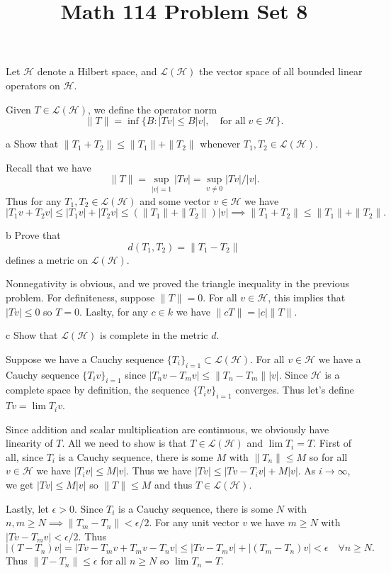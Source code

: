 \documentclass[11pt,letterpaper]{article}
\title{\textbf{Math 114 Problem Set 8}}
\def\H{\mathcal{H}}
\def\L{\mathcal{L}}
\begin{document}
\maketitle

\begin{problem}
    Let $\H$ denote a Hilbert space, and $\L(\H)$ the vector space of all bounded linear operators on $\H$.
\end{problem}

\begin{solution}
    Given $T \in \L(\H)$, we define the operator norm
    \[
        \|T\| = \inf\{B : |Tv| \leq B|v|,\quad\text{for all}\;v \in \H\}.
    \]
    \begin{partproblem}{a}
        Show that $\|T_1+T_2\| \leq \|T_1\|+\|T_2\|$ whenever $T_1,T_2 \in \L(\H)$.
    \end{partproblem}

    \quad Recall that we have
    \[
        \|T\| = \sup_{|v|=1} |Tv| = \sup_{v\neq 0} |Tv| / |v|
    .\] 
    Thus for any $T_1,T_2 \in \L(\H)$ and some vector $v\in \H$ we have
    \[
        |T_1v+T_2v| \leq |T_1v|+|T_2v| \leq (\|T_1\|+\|T_2\|)|v| \implies \|T_1+T_2\|\leq \|T_1\|+\|T_2\|
    .\] 

    \begin{partproblem}{b}
        Prove that
        \[
            d(T_1,T_2) = \|T_1-T_2\|
        \]
        defines a metric on $\L(\H)$.
    \end{partproblem}

    \quad Nonnegativity is obvious, and we proved the triangle inequality in the previous problem. For definiteness, suppose $\|T\|=0$. For all $v\in \H$, this implies that $|Tv|\leq 0$ so $T=0$. Laslty, for any $c\in k$ we have $\|cT\|=|c|\|T\|$.

    \begin{partproblem}{c}
        Show that $\L(\H)$ is complete in the metric $d$.
    \end{partproblem}

    \quad Suppose we have a Cauchy sequence $\{T_i\}_{i=1} \subset \L(\H)$. For all $v\in \H$ we have a Cauchy sequence $\{T_i v\}_{i=1}$ since $|T_n v - T_m v| \leq \|T_n - T_m\| |v|$. Since $\H$ is a complete space by definition, the sequence $\{T_i v\}_{i=1}$ converges. Thus let's define $Tv = \lim T_i v$. 
    
    \quad Since addition and scalar multiplication are continuous, we obviously have linearity of $T$. All we need to show is that $T\in \L(\H)$ and $\lim T_i = T$. First of all, since $T_i$ is a Cauchy sequence, there is some $M$ with $\|T_n\|\leq M$ so for all $v\in \H$ we have $|T_i v|\leq M|v|$. Thus we have $|Tv|\leq |Tv-T_iv|+M|v|$. As $i\to \infty$, we get $|Tv|\leq M|v|$ so $\|T\|\leq M$ and thus $T\in \L(\H)$.

    \quad Lastly, let $\epsilon>0$. Since $T_i$ is a Cauchy sequence, there is some $N$ with $n,m\geq N \implies \|T_m-T_n\|<\epsilon /2$. For any unit vector $v$ we have $m\geq N$ with $|Tv-T_mv|<\epsilon /2$. Thus
    \[
        |(T-T_n)v|=|Tv-T_mv+T_mv-T_nv|\leq |Tv -T_mv|+|(T_m-T_n)v|<\epsilon\quad \forall n\geq N
    .\] 
    Thus $\|T-T_n\|\leq \epsilon$ for all $n\geq N$ so $\lim T_n = T$.
\end{solution}
\end{document}
